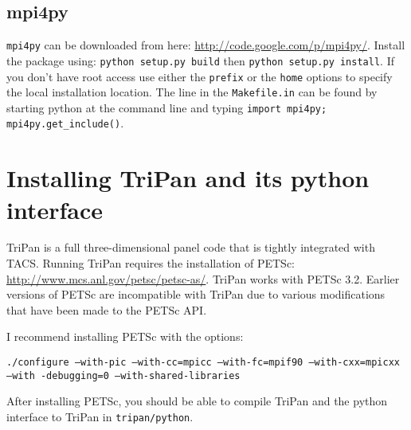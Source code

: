 \documentclass{article}
\begin{document}
\subsection{mpi4py}
 
\texttt{mpi4py} can be downloaded from here:
\url{http://code.google.com/p/mpi4py/}.  Install the package using:
\texttt{python setup.py build} then \texttt{python setup.py
  install}. If you don't have root access use either the
\texttt{prefix} or the \texttt{home} options to specify the local
installation location. The line in the \texttt{Makefile.in} can be
found by starting python at the command line and typing \texttt{import
  mpi4py; mpi4py.get\_include()}.

\section{Installing TriPan and its python interface}

TriPan is a full three-dimensional panel code that is tightly
integrated with TACS. Running TriPan requires the installation of
PETSc: \url{http://www.mcs.anl.gov/petsc/petsc-as/}.
TriPan works with PETSc 3.2. Earlier versions of PETSc are incompatible
with TriPan due to various modifications that have been made to the
PETSc API.

I recommend installing PETSc with the options:

\texttt{./configure --with-pic --with-cc=mpicc --with-fc=mpif90
  --with-cxx=mpicxx --with -debugging=0 --with-shared-libraries}

After installing PETSc, you should be able to compile TriPan and the
python interface to TriPan in \texttt{tripan/python}.
\end{document}
